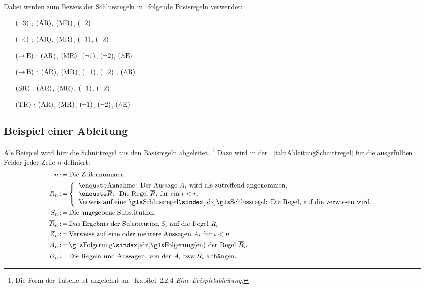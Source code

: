 Dabei werden zum Beweis der Schlussregeln in~\cite{bib:Rautenberg} folgende Basisregeln verwendet:
\begin{itemize}
	\renewcommand*{\itemindent}{1cm}
	\renewcommand*{\labelsep}{5pt}
	\item[$(\lnot\text{3})$ :] $(\text{AR})$, $(\text{MR})$,          $(\lnot\text{2})$
	\item[$(\lnot\text{4})$ :] $(\text{AR})$, $(\text{MR})$, $(\lnot\text{1})$, $(\lnot\text{2})$
	\item[$(\operatorname{\rightarrow}\text{E})$ :] $(\text{AR})$, $(\text{MR})$, $(\lnot\text{1})$, $(\lnot\text{2})$, $(\land\text{E})$
	\item[$(\operatorname{\rightarrow}\text{B})$ :] $(\text{AR})$, $(\text{MR})$, $(\lnot\text{1})$, $(\lnot\text{2})$        , $(\land\text{B})$
	\item[$(\text{SR})$ :]   $(\text{AR})$, $(\text{MR})$, $(\lnot\text{1})$, $(\lnot\text{2})$
	\item[$(\text{TR})$ :]   $(\text{AR})$, $(\text{MR})$, $(\lnot\text{1})$, $(\lnot\text{2})$, $(\land\text{E})$
\end{itemize}

\subsection{Beispiel einer Ableitung}%
\label{sub:BeispielAbleitung}

Als Beispiel wird hier die Schnittregel aus den Basisregeln abgeleitet.%
\footnote{%
	Die Form der Tabelle ist angelehnt an~\cite{bib:NatuerlichesSchliessen} Kapitel~2.2.4 \emph{Eine Beispielableitung}.%
}
Dazu wird in der \tablename~\vref{tab:AbleitungSchnittregel} für die ausgefüllten Felder jeder Zeile $n$ definiert:
\begin{align}
	n   & \defeq \text{Die Zeilennummer.}
	\\
	R_n & \defeq
	\left\{
		\begin{array}{l}
			\text{\strqt{Annahme}: Der Aussage $A_i$ wird als zutreffend angenommen,}\\
			\text{\forqt{$\overline{R}_i$}: Die Regel $\overline{R}_i$ für ein $i < n$,}\\
			\text{Verweis auf eine \glsIdx{Schlussregel}: Die Regel, auf die verwiesen wird.}
		\end{array}
	\right.
	\\
	S_n & \defeq \text{Die angegebene Substitution.}
	\\
	\overline{R}_n & \defeq \text{Das Ergebnis der Substitution $S_i$ auf die Regel $R_i$}
	\\
	Z_n & \defeq \text{Verweise auf eine oder mehrere Aussagen $A_i$ für $i < n$.}
	\\
	A_n & \defeq \text{\glsIdx{Folgerung}(en) der Regel $\overline{R}_i$.}
	\\
	D_n & \defeq \text{Die Regeln und Aussagen, von der $A_i$ \textbzw $\overline{R}_i$ abhängen.}
\end{align}

